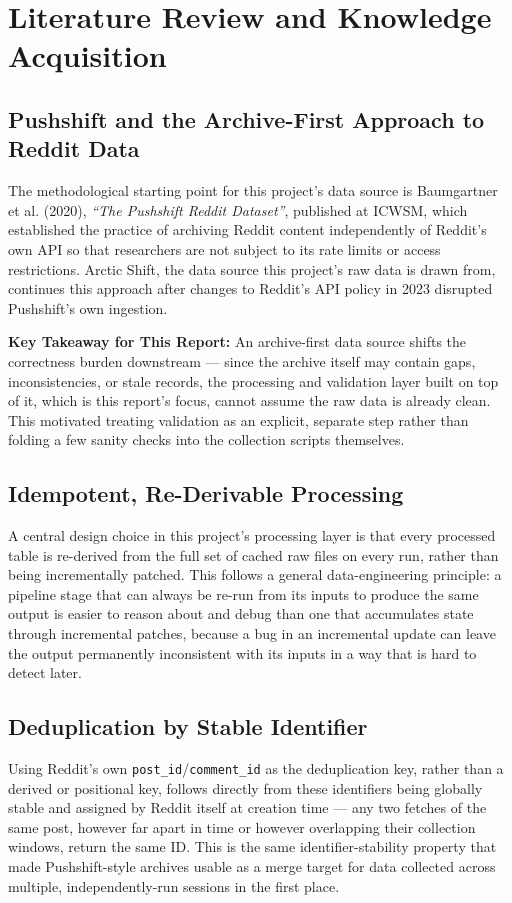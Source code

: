 \documentclass[12pt]{article}
\begin{document}
\section{Literature Review and Knowledge Acquisition}

\subsection{Pushshift and the Archive-First Approach to Reddit Data}
The methodological starting point for this project's data source is Baumgartner et al. (2020),
\textit{``The Pushshift Reddit Dataset''}, published at ICWSM, which established the practice of
archiving Reddit content independently of Reddit's own API so that researchers are not subject
to its rate limits or access restrictions. Arctic Shift, the data source this project's raw data
is drawn from, continues this approach after changes to Reddit's API policy in 2023 disrupted
Pushshift's own ingestion.

\textbf{Key Takeaway for This Report:} An archive-first data source shifts the correctness burden
downstream — since the archive itself may contain gaps, inconsistencies, or stale records, the
processing and validation layer built on top of it, which is this report's focus, cannot assume
the raw data is already clean. This motivated treating validation as an explicit, separate step
rather than folding a few sanity checks into the collection scripts themselves.

\subsection{Idempotent, Re-Derivable Processing}
A central design choice in this project's processing layer is that every processed table is
re-derived from the full set of cached raw files on every run, rather than being incrementally
patched. This follows a general data-engineering principle: a pipeline stage that can always be
re-run from its inputs to produce the same output is easier to reason about and debug than one
that accumulates state through incremental patches, because a bug in an incremental update can
leave the output permanently inconsistent with its inputs in a way that is hard to detect later.

\subsection{Deduplication by Stable Identifier}
Using Reddit's own \texttt{post\_id}/\texttt{comment\_id} as the deduplication key, rather than a
derived or positional key, follows directly from these identifiers being globally stable and
assigned by Reddit itself at creation time — any two fetches of the same post, however far apart
in time or however overlapping their collection windows, return the same ID. This is the same
identifier-stability property that made Pushshift-style archives usable as a merge target for
data collected across multiple, independently-run sessions in the first place.
\end{document}
